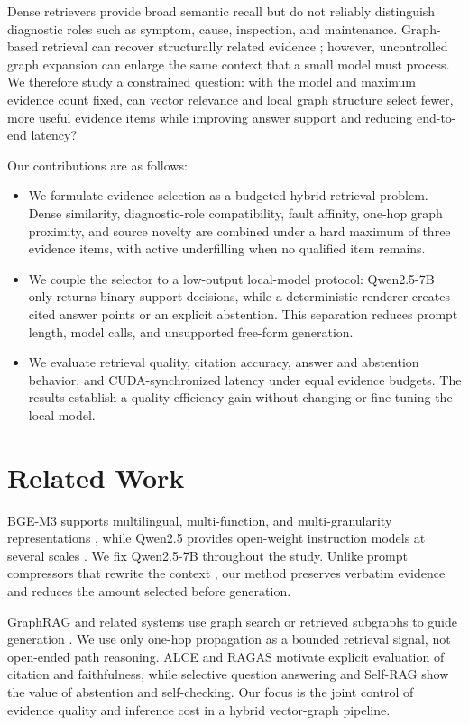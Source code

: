 \documentclass[conference]{IEEEtran}
\begin{document}
Dense retrievers provide broad semantic recall but do not reliably distinguish diagnostic roles such as symptom, cause, inspection, and maintenance. Graph-based retrieval can recover structurally related evidence \cite{edge2024graphrag,sun2024think,he2024gretriever,zhu2025kg2rag}; however, uncontrolled graph expansion can enlarge the same context that a small model must process. We therefore study a constrained question: with the model and maximum evidence count fixed, can vector relevance and local graph structure select fewer, more useful evidence items while improving answer support and reducing end-to-end latency?

Our contributions are as follows:
\begin{itemize}
    \item We formulate evidence selection as a budgeted hybrid retrieval problem. Dense similarity, diagnostic-role compatibility, fault affinity, one-hop graph proximity, and source novelty are combined under a hard maximum of three evidence items, with active underfilling when no qualified item remains.
    \item We couple the selector to a low-output local-model protocol: Qwen2.5-7B only returns binary support decisions, while a deterministic renderer creates cited answer points or an explicit abstention. This separation reduces prompt length, model calls, and unsupported free-form generation.
    \item We evaluate retrieval quality, citation accuracy, answer and abstention behavior, and CUDA-synchronized latency under equal evidence budgets. The results establish a quality-efficiency gain without changing or fine-tuning the local model.
\end{itemize}

\section{Related Work}

BGE-M3 supports multilingual, multi-function, and multi-granularity representations \cite{chen2024bgem3}, while Qwen2.5 provides open-weight instruction models at several scales \cite{yang2024qwen}. We fix Qwen2.5-7B throughout the study. Unlike prompt compressors that rewrite the context \cite{jiang2023llmlingua}, our method preserves verbatim evidence and reduces the amount selected before generation.

GraphRAG and related systems use graph search or retrieved subgraphs to guide generation \cite{edge2024graphrag,sun2024think,he2024gretriever,zhu2025kg2rag}. We use only one-hop propagation as a bounded retrieval signal, not open-ended path reasoning. ALCE \cite{gao2023alce} and RAGAS \cite{es2024ragas} motivate explicit evaluation of citation and faithfulness, while selective question answering \cite{kamath2020selective} and Self-RAG \cite{asai2024selfrag} show the value of abstention and self-checking. Our focus is the joint control of evidence quality and inference cost in a hybrid vector-graph pipeline.
\end{document}
